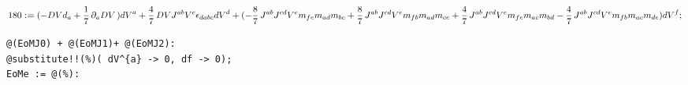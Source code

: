 \documentclass[11pt]{article}
\def\specialcolon{\mathrel{\mathop{:}}\hspace{-.5em}}
\begin{document}
\begin{dmath*}[compact, spread=2pt]
180\specialcolon{}= ( - DV {d}_{a} + \frac{1}{7}\, {\partial}_{a}{DV}\, ) {dV}^{a} + \frac{4}{7}\, DV {J}^{a b} {V}^{c} {\epsilon}_{d a b c} {dV}^{d} + ( - \frac{8}{7}\, {J}^{a b} {J}^{c d} {V}^{e} {m}_{f e} {m}_{a d} {m}_{b c} + \frac{8}{7}\, {J}^{a b} {J}^{c d} {V}^{e} {m}_{f b} {m}_{a d} {m}_{c e} + \frac{4}{7}\, {J}^{a b} {J}^{c d} {V}^{e} {m}_{f e} {m}_{a c} {m}_{b d} - \frac{4}{7}\, {J}^{a b} {J}^{c d} {V}^{e} {m}_{f b} {m}_{a c} {m}_{d e}) {dV}^{f};
\end{dmath*}
{\color[named]{Blue}\begin{verbatim}
@(EoMJ0) + @(EoMJ1)+ @(EoMJ2):
@substitute!!(%)( dV^{a} -> 0, df -> 0);
EoMe := @(%):
\end{verbatim}}
\end{document}
